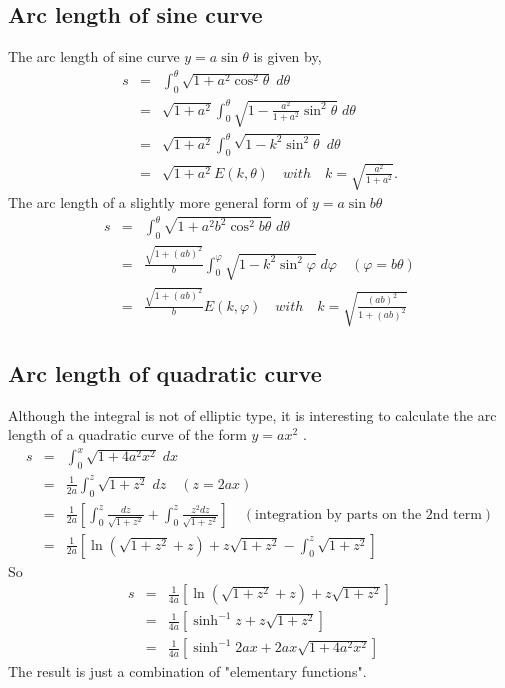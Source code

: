 \documentclass{article}
\begin{document}
\subsection{Arc length of sine curve}
\label{sec-2-2}
The arc length of sine curve $y = a \sin{\theta}$ is given by,
\begin{eqnarray}
s &=&  \int_{0}^{\theta} \sqrt{ 1  +   a^{2} \cos^{2}{\theta}} \; d\theta \\ \nonumber
  &=& \sqrt{1 +a^{2}} \int_{0}^{\theta} \sqrt{ 1  -   \frac{a^{2}}{1 +a ^{2}} \sin^{2}{\theta}} \; d\theta \\ \nonumber
  &=& \sqrt{1 +a^{2}} \int_{0}^{\theta} \sqrt{ 1  -   k^{2} \sin^{2}{\theta}} \; d\theta \\ \nonumber
  &=& \sqrt{1 +a^{2}} E(k, \theta) \quad with \quad k = \sqrt{\frac{a^{2}}{1+a^{2}}}.
\end{eqnarray}
The arc length of a slightly more general form of $y = a \sin{b \theta}$
\begin{eqnarray}
s &=&  \int_{0}^{\theta} \sqrt{ 1  +   a^{2} b^{2} \cos^{2}{ b \theta}} \; d\theta \\ \nonumber
  &=& \frac{\sqrt{1 +(ab)^{2}}}{b} \int_{0}^{\varphi} \sqrt{ 1  -   k^{2} \sin^{2}{\varphi}} \; d\varphi \quad (\varphi = b\theta) \\ \nonumber
  &=& \frac{\sqrt{1 +(ab)^{2}}}{b} E(k, \varphi) \quad with \quad k = \sqrt{\frac{(ab)^{2}}{1+(ab)^{2}}}
\end{eqnarray}
\subsection{Arc length of quadratic curve}
\label{sec-2-3}
Although the integral is not of elliptic type, it is interesting to calculate the arc length of a quadratic curve of the form $y=a x^{2}$ .
\begin{eqnarray}
s &=&  \int_{0}^{x} \sqrt{ 1  + 4 a^{2} x^{2} } \; dx \\ \nonumber
  &=& \frac{1}{2a} \int_{0}^{z} \sqrt{ 1  +   z^{2}} \; dz \quad (z = 2ax) \\ \nonumber
  &=& \frac{1}{2a} \left[ \int_{0}^{z} \frac{dz}{\sqrt{1 + z^{2}}} + \int_{0}^{z} \frac{z^{2}dz}{\sqrt{1 + z^{2}}} \right]  \quad (\text{integration by parts on the 2nd term}) \\ \nonumber
  &=& \frac{1}{2a} \left[ \ln{\left( \sqrt{1 + z^{2}} + z \right)} + z\sqrt{1 + z^{2}} - \int_{0}^{z} \sqrt{1 + z^{2}} \right]
\end{eqnarray}
So
\begin{eqnarray}
s &=& \frac{1}{4a} \left[ \ln{\left( \sqrt{1 + z^{2}} + z \right)} + z\sqrt{1 + z^{2}} \right] \\ \nonumber
  &=& \frac{1}{4a} \left[ \sinh^{-1}{z} + z\sqrt{1 + z^{2}} \right] \\ \nonumber
  &=& \frac{1}{4a} \left[ \sinh^{-1}{2ax} + 2ax\sqrt{1 + 4a^{2}x^{2}} \right] 
\end{eqnarray}
The result is just a combination of "elementary functions".
\end{document}
